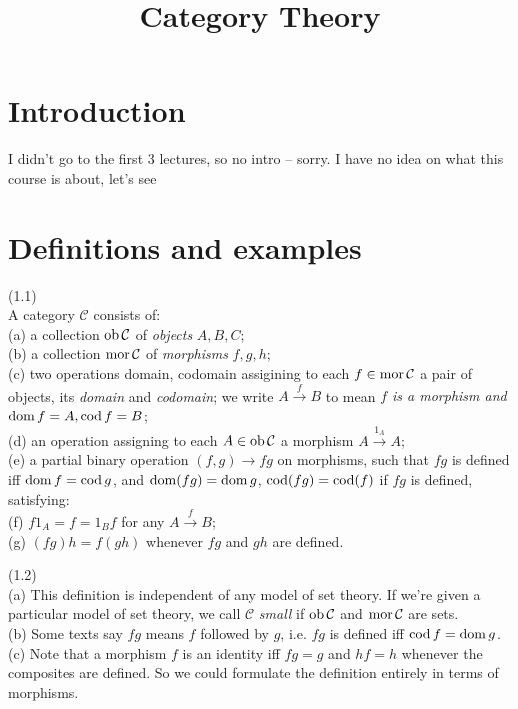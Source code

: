 \documentclass[a4paper]{article}
\begin{document}
\title{Category Theory}

\maketitle

\newpage

\tableofcontents

\newpage

\section{Introduction}
I didn't go to the first 3 lectures, so no intro -- sorry. I have no idea on what this course is about, let's see

\newpage

\section{Definitions and examples}
\begin{defi} (1.1)\\
    A category $\mathcal{C}$ consists of:\\
    (a) a collection $\operatorname{ob}\mathcal{C}$ of \emph{objects} $A,B,C$;\\
    (b) a collection $\operatorname{mor}\mathcal{C}$ of \emph{morphisms} $f,g,h$;\\
    (c) two operations domain, codomain assigining to each $f \in \operatorname{mor}\mathcal{C}$ a pair of objects, its \emph{domain} and \emph{codomain}; we write $A \xrightarrow{f} B$ to mean \emph{$f$ is a morphism and $\operatorname{dom} f = A, \operatorname{cod} f = B$};\\
    (d) an operation assigning to each $A \in \operatorname{ob}\mathcal{C}$ a morphism $A \xrightarrow{1_A} A$;\\
    (e) a partial binary operation $(f,g) \to fg$ on morphisms, such that $fg$ is defined iff $\operatorname{dom} f = \operatorname{cod} g$, and $\operatorname{dom}(fg) = \operatorname{dom} g$, $\operatorname{cod}(fg) = \operatorname{cod}(f)$ if $fg$ is defined, satisfying:\\
    (f) $f 1_A = f = 1_B f$ for any $A \xrightarrow{f} B$;\\
    (g) $(fg) h = f(gh)$ whenever $fg$ and $gh$ are defined.
\end{defi}

\begin{rem} (1.2)\\
    (a) This definition is independent of any model of set theory. If we're given a particular model of set theory, we call $\mathcal{C}$ \emph{small} if $\operatorname{ob} \mathcal{C}$ and $\operatorname{mor}\mathcal{C}$ are sets.\\
    (b) Some texts say $fg$ means $f$ followed by $g$, i.e. $fg$ is defined iff $\operatorname{cod} f = \operatorname{dom} g$.\\
    (c) Note that a morphism $f$ is an identity iff $fg = g$ and $hf = h$ whenever the composites are defined. So we could formulate the definition entirely in terms of morphisms.
\end{rem}
\end{document}
